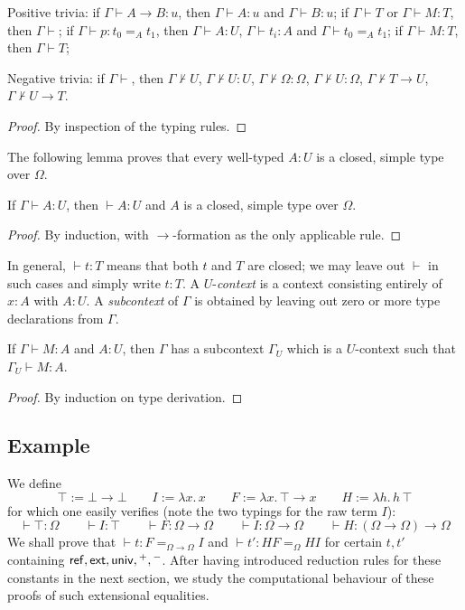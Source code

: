 \documentclass[10pt,a4paper]{article}
\newcommand{\GamU}{\Gamma_{\!U}}
\newcommand{\Ref}{{\sf ref}}
\newcommand{\ext}{{\sf ext}}
\newcommand{\univ}{{\sf univ}}
\begin{document}
\begin{lemma}\label{typetrivia} Positive trivia:
if $\Gamma\vdash A{\to}B:u$, then $\Gamma\vdash A:u$ and $\Gamma\vdash B:u$;
if $\Gamma\vdash T$ or $\Gamma\vdash M:T$, then $\Gamma\vdash$;
if $\Gamma\vdash p: t_0 =_A t_1$, then $\Gamma\vdash A:U$, $\Gamma\vdash t_i:A$ 
and $\Gamma\vdash t_0 =_A t_1$;
if $\Gamma\vdash M:T$, then $\Gamma\vdash T$;

Negative trivia:
if $\Gamma\vdash$, then
$\Gamma\not\vdash U$,
$\Gamma\not\vdash U:U$,
$\Gamma\not\vdash \Omega:\Omega$,
$\Gamma\not\vdash U:\Omega$,
$\Gamma\not\vdash T{\to}U$,
$\Gamma\not\vdash U{\to}T$.
\end{lemma}
\begin{proof}By inspection of the typing rules.\end{proof}
The following lemma proves that every well-typed $A:U$ is a closed, simple type over $\Omega$.
\begin{lemma}\label{UtypesOmegasimple}
If $\Gamma\vdash A:U$, then $\vdash A:U$ and $A$ is a closed, simple type over $\Omega$.
\end{lemma}
\begin{proof}By induction, with ${\to}$-formation as the only applicable rule.\end{proof}
In general, $\vdash t:T$ means that both $t$ and $T$ are closed;
we may leave out $\vdash$ in such cases and simply write $t:T$.
A $U$-\emph{context} is a context consisting entirely of $x:A$ with $A:U$.
A \emph{subcontext} of $\Gamma$ is obtained by leaving out zero or more 
type declarations from $\Gamma$.
\begin{lemma}\label{Ucontext}
If $\Gamma\vdash M:A$ and $A:U$, then $\Gamma$ has a subcontext $\GamU$
which is a $U$-context such that  $\GamU\vdash M:A$.
\end{lemma}
\begin{proof}By induction on type derivation.\end{proof}

\subsection{Example}
We define 
\[
\top:=\bot\to\bot \quad\quad I := \lambda x.\,x \quad\quad
F:=\lambda x.\,\top\to x \quad\quad H :=\lambda h.\,h\,\top
\] 
for which one easily verifies (note the two typings for the raw term $I$):
\[
\vdash \top:\Omega\quad\quad
\vdash I:\top \quad\quad
\vdash F:\Omega\to\Omega \quad\quad
\vdash I:\Omega\to\Omega \quad\quad
\vdash H:(\Omega\to\Omega)\to\Omega
\]
We shall prove that $\vdash t: F =_{\Omega\to\Omega} I$ and 
$\vdash t': HF =_\Omega HI$ for certain $t,t'$ containing
$\Ref,\ext,\univ,{}^+,{}^-$. After having introduced reduction rules
for these constants in the next section, we study the computational
behaviour of these proofs of such extensional equalities.
\end{document}
